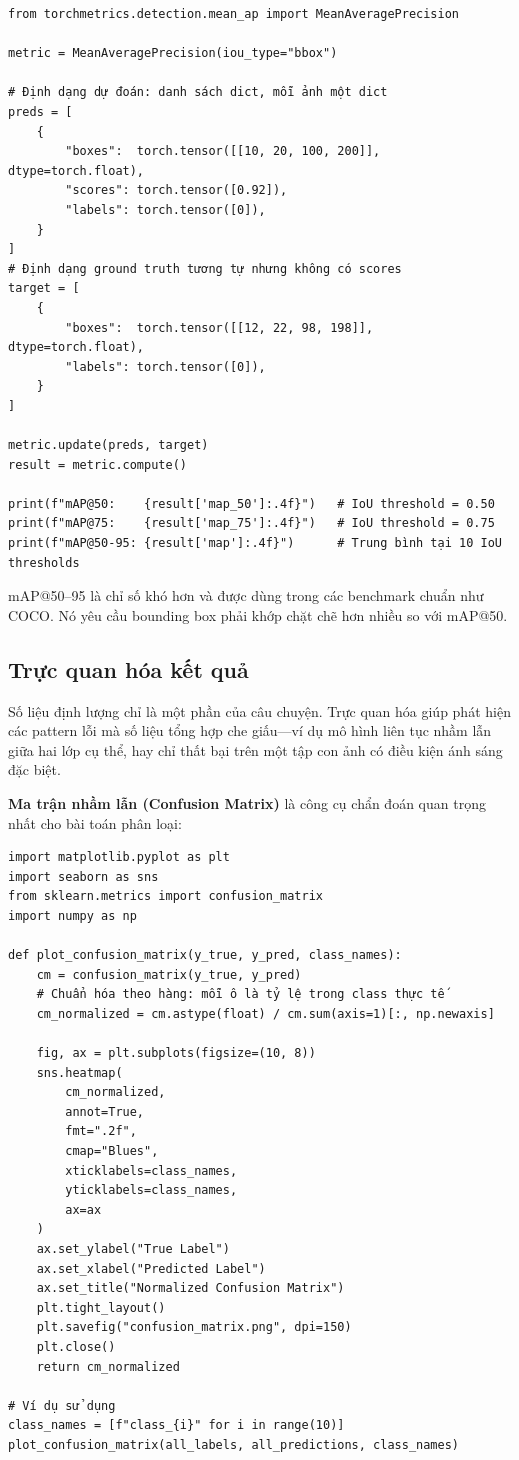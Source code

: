 \begin{verbatim}
from torchmetrics.detection.mean_ap import MeanAveragePrecision

metric = MeanAveragePrecision(iou_type="bbox")

# Định dạng dự đoán: danh sách dict, mỗi ảnh một dict
preds = [
    {
        "boxes":  torch.tensor([[10, 20, 100, 200]], dtype=torch.float),
        "scores": torch.tensor([0.92]),
        "labels": torch.tensor([0]),
    }
]
# Định dạng ground truth tương tự nhưng không có scores
target = [
    {
        "boxes":  torch.tensor([[12, 22, 98, 198]], dtype=torch.float),
        "labels": torch.tensor([0]),
    }
]

metric.update(preds, target)
result = metric.compute()

print(f"mAP@50:    {result['map_50']:.4f}")   # IoU threshold = 0.50
print(f"mAP@75:    {result['map_75']:.4f}")   # IoU threshold = 0.75
print(f"mAP@50-95: {result['map']:.4f}")      # Trung bình tại 10 IoU thresholds
\end{verbatim}

mAP@50--95 là chỉ số khó hơn và được dùng trong các benchmark chuẩn như COCO. Nó yêu cầu bounding box phải khớp chặt chẽ hơn nhiều so với mAP@50.

\subsection{Trực quan hóa kết quả}
\label{subsec:visualization}

Số liệu định lượng chỉ là một phần của câu chuyện. Trực quan hóa giúp phát hiện các pattern lỗi mà số liệu tổng hợp che giấu---ví dụ mô hình liên tục nhầm lẫn giữa hai lớp cụ thể, hay chỉ thất bại trên một tập con ảnh có điều kiện ánh sáng đặc biệt.

\textbf{Ma trận nhầm lẫn (Confusion Matrix)} là công cụ chẩn đoán quan trọng nhất cho bài toán phân loại:

\begin{verbatim}
import matplotlib.pyplot as plt
import seaborn as sns
from sklearn.metrics import confusion_matrix
import numpy as np

def plot_confusion_matrix(y_true, y_pred, class_names):
    cm = confusion_matrix(y_true, y_pred)
    # Chuẩn hóa theo hàng: mỗi ô là tỷ lệ trong class thực tế
    cm_normalized = cm.astype(float) / cm.sum(axis=1)[:, np.newaxis]

    fig, ax = plt.subplots(figsize=(10, 8))
    sns.heatmap(
        cm_normalized,
        annot=True,
        fmt=".2f",
        cmap="Blues",
        xticklabels=class_names,
        yticklabels=class_names,
        ax=ax
    )
    ax.set_ylabel("True Label")
    ax.set_xlabel("Predicted Label")
    ax.set_title("Normalized Confusion Matrix")
    plt.tight_layout()
    plt.savefig("confusion_matrix.png", dpi=150)
    plt.close()
    return cm_normalized

# Ví dụ sử dụng
class_names = [f"class_{i}" for i in range(10)]
plot_confusion_matrix(all_labels, all_predictions, class_names)
\end{verbatim}

